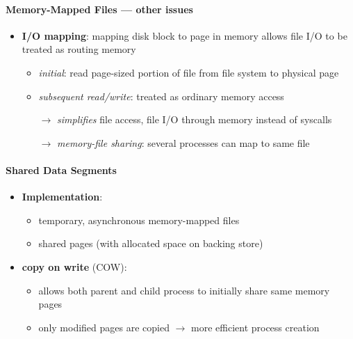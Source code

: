 \paragraph{Memory-Mapped Files --- other issues}
\begin{itemize}
  \item \textbf{I/O mapping}: mapping disk block to page in memory allows file I/O to be treated as routing memory
  \begin{itemize}
    \item \emph{initial}: read page-sized portion of file from file system to physical page
    \item \emph{subsequent read/write}: treated as ordinary memory access
    \item[$ \to $] \emph{simplifies} file access, file I/O through memory instead of syscalls
    \item[$ \to $] \emph{memory-file sharing}: several processes can map to same file
  \end{itemize}
\end{itemize}

\paragraph{Shared Data Segments}
\begin{itemize}
  \item \textbf{Implementation}:
  \begin{itemize}
    \item temporary, asynchronous memory-mapped files
    \item shared pages (with allocated space on backing store)
  \end{itemize}
  \item \textbf{copy on write} (COW):
  \begin{itemize}
    \item allows both parent and child process to initially share same memory pages
    \item only modified pages are copied $ \to $ more efficient process creation
  \end{itemize}
\end{itemize}

